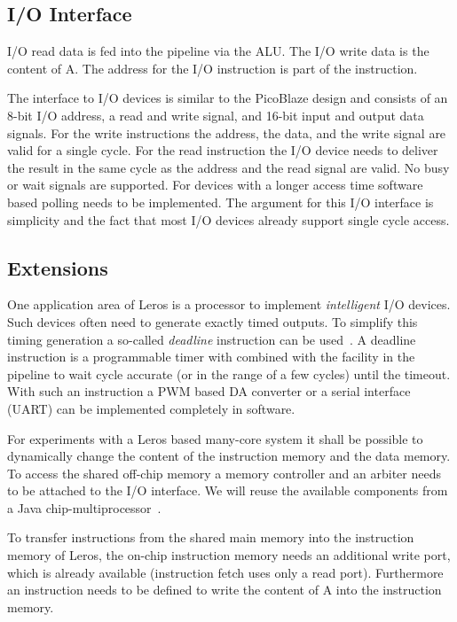 \documentclass[a4paper,fontsize=10pt,twoside,DIV15,BCOR12mm,headinclude=true,footinclude=false,pagesize,bibtotoc]{scrbook}
\begin{document}
\subsection{I/O Interface}

I/O read data is fed into the pipeline via the ALU. The I/O write data is the content of A. The address for the I/O instruction is part of the instruction.

The interface to I/O devices is similar to the PicoBlaze design and consists of an 8-bit I/O address, a read and write signal, and 16-bit input and output data signals. For the write instructions the address, the data, and the write signal are valid for a single cycle. For the read instruction the I/O device needs to deliver the result in the same cycle as the address and the read signal are valid. No busy or wait signals are supported. For devices with a longer access time software based polling needs to be implemented. The argument for this I/O interface is simplicity and the fact that most I/O devices already support single cycle access.


\subsection{Extensions}

One application area of Leros is a processor to implement \emph{intelligent} I/O devices. Such devices often need to generate exactly timed outputs. To simplify this timing generation a so-called \emph{deadline} instruction can be used~\cite{Edwards:06:deadline, jop:deadline}. A deadline instruction is a programmable timer with combined with the facility in the pipeline to wait cycle accurate (or in the range of a few cycles) until the timeout. With such an instruction a PWM based DA converter or a serial interface (UART) can be implemented completely in software.

For experiments with a Leros based many-core system it shall be possible to dynamically change the content of the instruction memory and the data memory. To access the shared off-chip memory a memory controller and an arbiter needs to be attached to the I/O interface. We will reuse the available components from a Java chip-multiprocessor~\cite{jop:tecs:cmp}.

To transfer instructions from the shared main memory into the instruction memory of Leros, the on-chip instruction memory needs an additional write port, which is already available (instruction fetch uses only a read port). Furthermore an instruction needs to be defined to write the content of A into the instruction memory.
\end{document}
